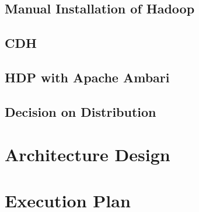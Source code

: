 \subsection{Manual Installation of Hadoop}

\subsection{\acl{CDH}}

\subsection{\acl{HDP} with Apache Ambari}

\subsection{Decision on Distribution}

\section{Architecture Design}

\section{Execution Plan}
